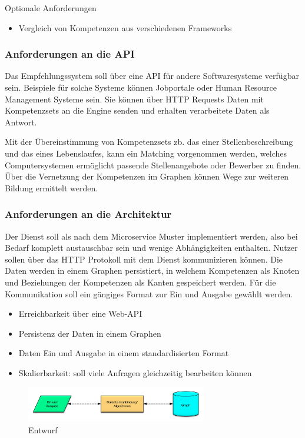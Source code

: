 Optionale Anforderungen

\begin{itemize}
	\item Vergleich von Kompetenzen aus verschiedenen Frameworks
\end{itemize}

\subsubsection{Anforderungen an die API}

Das Empfehlungssystem soll über eine API für andere Softwaresysteme verfügbar sein. Beispiele für solche Systeme können Jobportale oder Human Resource Management Systeme sein. Sie können über HTTP Requests Daten mit Kompetenzsets an die Engine senden und erhalten verarbeitete Daten als Antwort.

Mit der Übereinstimmung von Kompetenzsets zb. das einer Stellenbeschreibung und das eines Lebenslaufes, kann ein Matching vorgenommen werden, welches Computersystemen ermöglicht passende Stellenangebote oder Bewerber zu finden. Über die Vernetzung der Kompetenzen im Graphen können Wege zur weiteren Bildung ermittelt werden.


\subsubsection{Anforderungen an die Architektur}

Der Dienst soll als nach dem Microservice Muster implementiert werden, also bei Bedarf komplett austauschbar sein und wenige Abhängigkeiten enthalten. Nutzer sollen über das HTTP Protokoll mit dem Dienst kommunizieren können. Die Daten werden in einem Graphen persistiert, in welchem Kompetenzen als Knoten und Beziehungen der Kompetenzen als Kanten gespeichert werden. Für die Kommunikation soll ein gängiges Format zur Ein und Ausgabe gewählt werden.

\begin{itemize}
	\item Erreichbarkeit über eine Web-API 
	\item Persistenz der Daten in einem Graphen	
	\item Daten Ein und Ausgabe in einem standardisierten Format 
	\item Skalierbarkeit: soll viele Anfragen gleichzeitig bearbeiten können
\end{itemize}

\begin{figure}[htb]
 \centering
 \includegraphics[width=0.7\textwidth,angle=0]{abb/Entwurf}
 \caption[Beschreibung]{Entwurf}
\label{fig:Entwurf}
\end{figure}




